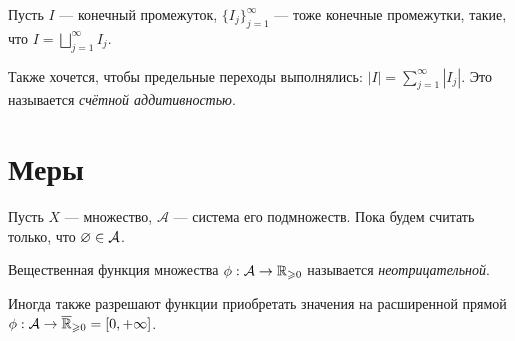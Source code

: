 \documentclass[a4paper]{report}
\begin{document}
    Пусть $I$ --- конечный промежуток, $\{I_j\}_{j=1}^{\infty}$ --- тоже конечные промежутки, такие, что $I = \bigsqcup\limits_{j = 1}^{\infty}I_j$.

    Также хочется, чтобы предельные переходы выполнялись: $|I| = \sum\limits_{j = 1}^{\infty}|I_j|$.
    Это называется \emph{счётной аддитивностью}.


    \section{Меры}
    Пусть $X$ --- множество, $\mathcal{A}$ --- система его подмножеств.
    Пока будем считать только, что $\varnothing \in \mathcal{A}$.

    Вещественная функция множества $\phi: \mathcal{A} \rightarrow \mathbb{R}_{\geqslant 0}$ называется \emph{неотрицательной}.

    Иногда также разрешают функции приобретать значения на расширенной прямой $\phi: \mathcal{A} \rightarrow \overline{\mathbb{R}}_{\geqslant 0 } = [0, +\infty]$.
\end{document}
